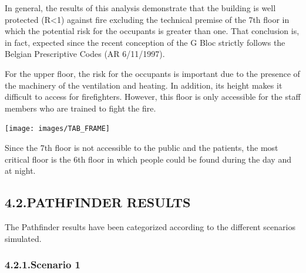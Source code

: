\documentclass{style/llncs}
\begin{document}
In general, the results of this analysis demonstrate that the building is
well protected (R\textless{}1) against fire excluding the technical premise of
the 7th floor in which the potential risk for the occupants is greater
than one. That conclusion is, in fact, expected since the recent
conception of the G Bloc strictly follows the Belgian Prescriptive Codes
(AR 6/11/1997).%

For the upper floor, the risk for the occupants is important due to the
presence of the machinery of the ventilation and heating. In addition,
its height makes it difficult to access for firefighters. However, this
floor is only accessible for the staff members who are trained to fight
the fire.%

\begin{table}[tbp]%
\begin{mdcenter}%

\noindent{}\texttt{[image: images/TAB\_FRAME]}{}%

\mdhr{}%

\noindent{}%
\end{mdcenter}\label{tab-frame}%
\end{table}%

\noindent{}Since the 7th floor is not accessible to the public and the patients, the
most critical floor is the 6th floor in which people could be found
during the day and at night.%

\subsection{4.2.\hspace*{0.5em}PATHFINDER RESULTS}\label{sec-pathfinder-results}%

\noindent{}The Pathfinder results have been categorized according to the different
scenarios simulated.%

\subsubsection{4.2.1.\hspace*{0.5em}Scenario 1}\label{path-s1}%
\end{document}
